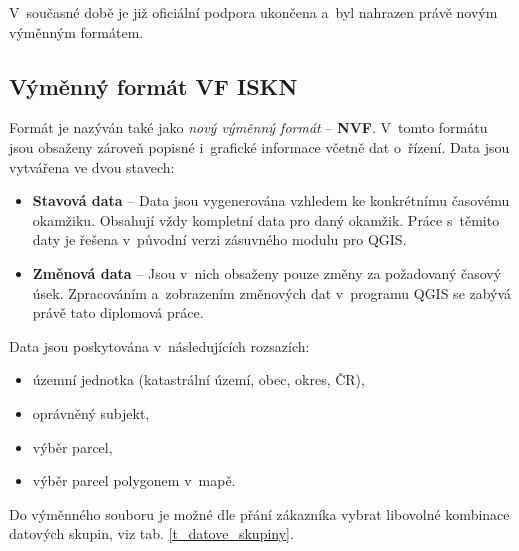 \documentclass[a4paper,12pt,oneside]{book}
\begin{document}
V~současné době je již oficiální podpora ukončena a~byl nahrazen právě
novým výměnným formátem. \cite{svf_cuzk}

\subsection{Výměnný formát VF ISKN}

Formát je nazýván také jako \textit{nový výměnný formát} --
\textbf{NVF}. V~tomto formátu jsou obsaženy zároveň popisné i~grafické
informace včetně dat o~řízení. Data jsou vytvářena ve dvou stavech:

\begin{itemize}
\item \textbf{Stavová data} -- Data jsou vygenerována vzhledem ke
  konkrétnímu časovému okamžiku. Obsahují vždy kompletní data pro daný
  okamžik. Práce s~těmito daty je řešena v~původní verzi zásuvného
  modulu pro QGIS.
 
\item \textbf{Změnová data} -- Jsou v~nich obsaženy pouze změny za
  požadovaný časový úsek. Zpracováním a~zobrazením změnových dat
  v~programu QGIS se zabývá právě tato diplomová práce.
\end{itemize}

Data jsou poskytována v~následujících rozsazích:

\begin{itemize}
 \item územní jednotka (katastrální území, obec, okres, ČR),
 \item oprávněný subjekt,
 \item výběr parcel,
 \item výběr parcel polygonem v~mapě.
\end{itemize}

Do výměnného souboru je možné dle přání zákazníka vybrat libovolné
kombinace datových skupin, viz
tab. \ref{t_datove_skupiny}. \cite{dp_landa}
\end{document}
